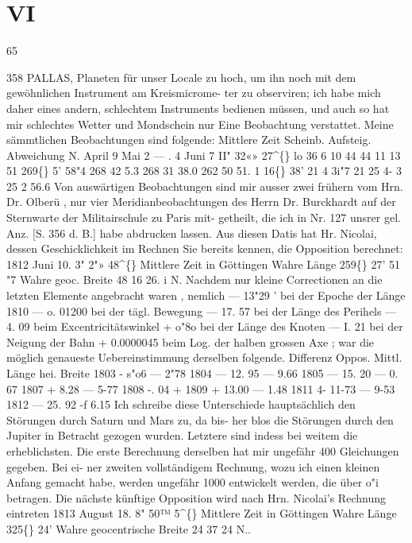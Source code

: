 \documentclass[12pt,a4paper]{article}
\newcommand{\degree}{\textdegree}
\begin{document}
\section*{VI}
65 


\newpage
358 
PALLAS, 
Planeten  für  unser  Locale  zu  hoch,  um  ihn  noch  mit  dem  gewöhnlichen  Instrument  am  Kreismicrome- 
ter zu  observiren;  ich  habe  mich  daher  eines  andern,  schlechtem  Instruments  bedienen  müssen,  und  auch 
so  hat  mir  schlechtes  Wetter  und  Mondschein  nur  Eine  Beobachtung  verstattet.  Meine  sämmtlichen 
Beobachtungen  sind  folgende: 
Mittlere  Zeit Scheinb.  Aufsteig. Abweichung  N. 
April  9 
Mai      2 
--- .     4 
Juni     7 
II"    32«»  27\textasciicircum\{\} 
lo     36       6 
10  44     44 
11  13     51 
269\degree\{\}     5'    58"4 
268     42       5.3 
268     31     38.0 
262     50     51. 1 
16\degree\{\}  38' 
21      4    3i"7 
21     25       4-  3 
25       2     56.6 
Von  auswärtigen  Beobachtungen   sind  mir   ausser   zwei  frühern  vom  Hrn.  Dr.  Olberü  ,    nur  vier 
Meridianbeobachtungen  des  Herrn  Dr.  Burckhardt  auf  der  Sternwarte  der  Militairschule    zu  Paris  mit- 
getheilt,  die  ich  in  Nr.  127  unsrer  gel.  Anz.  [S.  356  d.  B.]  habe  abdrucken  lassen.     Aus  diesen  Datis  hat 
Hr.  Nicolai,  dessen  Geschicklichkeit  im  Rechnen  Sie  bereits  kennen,  die  Opposition  berechnet: 
1812  Juni  10.  3"  2"»  48\textasciicircum\{\}  Mittlere  Zeit  in  Göttingen 
Wahre  Länge   
259\degree\{\}  27'    51  "7 
Wahre  geoc.  Breite   
48     16     26.  i  N. 
Nachdem  nur  kleine  Correctionen  an  die  letzten  Elemente  angebracht  waren ,  nemlich 
--- 13"29  '      bei  der  Epoche  der  Länge  1810 
---  o.  01200  bei  der  tägl.  Bewegung 
---  17.  57        bei  der  Länge  des  Perihels 
---  4. 09        beim  Excentricitätswinkel 
+  o"8o  bei  der  Länge  des  Knoten 
---  I.  21  bei  der  Neigung  der  Bahn 
+  0.0000045  beim  Log.  der  halben  grossen  Axe ; 
war  die  möglich  genaueste  Uebereinstimmung  derselben  folgende. 
Differenz 
Oppos. 
Mittl.  Länge hei. Breite 
1803 
-   s"o6 
--- 
2"78 
1804 
---  12.  95 
--- 
9.66 
1805 
---  15.  20 
--- 
0.  67 
1807 
+    8.28 
--- 
5-77 
1808 
-.  04 
+ 
1809 
+  13.00 
--- 
1.48 
1811 
4-  11-73 
--- 
9-53 
1812 
---  25.  92 
-f 
6.15 
Ich  schreibe  diese  Unterschiede  hauptsächlich  den  Störungen  durch  Saturn  und  Mars  zu,  da  bis- 
her blos  die  Störungen  durch  den  Jupiter  in  Betracht  gezogen  wurden.  Letztere  sind  indess  bei  weitem 
die  erheblichsten.  Die  erste  Berechnung  derselben  hat  mir  ungefähr  400  Gleichungen  gegeben.  Bei  ei- 
ner zweiten  vollständigem  Rechnung,  wozu  ich  einen  kleinen  Anfang  gemacht  habe,  werden  ungefähr 
1000  entwickelt  werden,  die  über  o"i  betragen.  Die  nächste  künftige  Opposition  wird  nach  Hrn.  Nicolai's 
Rechnung  eintreten 
1813  August  18.  8"  50™  5\textasciicircum\{\}  Mittlere  Zeit  in  Göttingen 
Wahre  Länge   
325\degree\{\}  24' 
Wahre  geocentrische  Breite   
24    37 
24  N.. 
\end{document}
